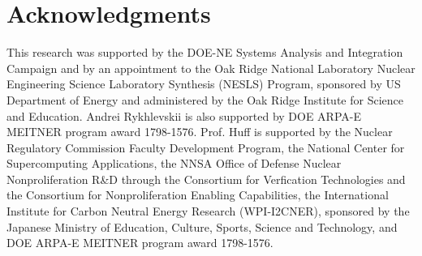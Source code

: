 \documentclass[letterpaper]{mandc2019}
\begin{document}
\section{Acknowledgments}
This research was supported by the DOE-NE Systems Analysis and Integration Campaign and by an appointment to the Oak Ridge National Laboratory Nuclear Engineering Science Laboratory Synthesis (NESLS) Program, sponsored by US Department of Energy and administered by the Oak Ridge Institute for Science and Education. Andrei Rykhlevskii is also supported by DOE 
ARPA-E MEITNER program award 1798-1576. Prof. Huff is supported by the Nuclear Regulatory 
Commission Faculty Development Program, the National Center for Supercomputing Applications, the NNSA Office of Defense Nuclear Nonproliferation R\&D through 
the Consortium for Verfication Technologies and the Consortium for Nonproliferation 
Enabling Capabilities,  the International Institute for Carbon Neutral Energy Research 
(WPI-I2CNER), sponsored by the Japanese Ministry of Education, Culture, Sports, 
Science and Technology, and DOE ARPA-E MEITNER program award 1798-1576.
\setlength{\baselineskip}{12pt}


\end{document}
